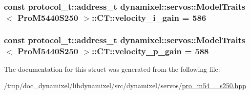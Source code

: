 \subsubsection[{\texorpdfstring{velocity\+\_\+i\+\_\+gain}{velocity_i_gain}}]{\setlength{\rightskip}{0pt plus 5cm}const {\bf protocol\+\_\+t\+::address\+\_\+t} {\bf dynamixel\+::servos\+::\+Model\+Traits}$<$ {\bf Pro\+M5440\+S250} $>$\+::C\+T\+::velocity\+\_\+i\+\_\+gain = 586\hspace{0.3cm}{\ttfamily [static]}}\hypertarget{structdynamixel_1_1servos_1_1_model_traits_3_01_pro_m5440_s250_01_4_1_1_c_t_a729b745f4f0c2d11d11263500d33b56c}{}\label{structdynamixel_1_1servos_1_1_model_traits_3_01_pro_m5440_s250_01_4_1_1_c_t_a729b745f4f0c2d11d11263500d33b56c}
\subsubsection[{\texorpdfstring{velocity\+\_\+p\+\_\+gain}{velocity_p_gain}}]{\setlength{\rightskip}{0pt plus 5cm}const {\bf protocol\+\_\+t\+::address\+\_\+t} {\bf dynamixel\+::servos\+::\+Model\+Traits}$<$ {\bf Pro\+M5440\+S250} $>$\+::C\+T\+::velocity\+\_\+p\+\_\+gain = 588\hspace{0.3cm}{\ttfamily [static]}}\hypertarget{structdynamixel_1_1servos_1_1_model_traits_3_01_pro_m5440_s250_01_4_1_1_c_t_a92d82ae7ed22c79851f03b4f9c004b8b}{}\label{structdynamixel_1_1servos_1_1_model_traits_3_01_pro_m5440_s250_01_4_1_1_c_t_a92d82ae7ed22c79851f03b4f9c004b8b}


The documentation for this struct was generated from the following file\+:\begin{DoxyCompactItemize}
\item 
/tmp/doc\+\_\+dynamixel/libdynamixel/src/dynamixel/servos/\hyperlink{pro__m54__40__s250_8hpp}{pro\+\_\+m54\+\_\+\_\+s250.\+hpp}\end{DoxyCompactItemize}
